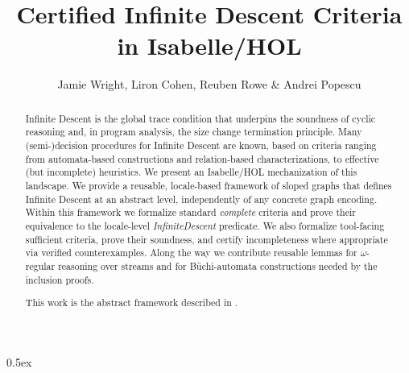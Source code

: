 \documentclass[11pt,a4paper]{article}
\begin{document}
\title{Certified Infinite Descent Criteria in Isabelle/HOL}
\author{Jamie Wright, Liron Cohen, Reuben Rowe \& Andrei Popescu}
\maketitle

\begin{abstract}
Infinite Descent is the global trace condition that underpins the soundness of cyclic reasoning and, in program analysis, the size change termination principle.
Many (semi-)decision procedures for Infinite Descent are known, based on criteria ranging from automata-based constructions and relation-based characterizations, to effective (but incomplete) heuristics.
%
We present an Isabelle/HOL mechanization of this landscape.
We provide a reusable, locale-based framework of sloped graphs that defines Infinite Descent at an abstract level,
independently of any concrete graph encoding.
Within this framework we formalize standard \emph{complete} criteria and prove their equivalence to the locale-level \textit{InfiniteDescent} predicate.
We also formalize tool-facing sufficient criteria, 
prove their soundness, and certify incompleteness where appropriate via verified counterexamples.
Along the way we contribute reusable lemmas for $\omega$-regular reasoning over streams and for B\"uchi-automata constructions needed by the inclusion proofs.

This work is the abstract framework described in \cite{Wright_et_al}.
\end{abstract} 

\tableofcontents

\parindent 0pt\parskip 0.5ex



%
%




\end{document}
